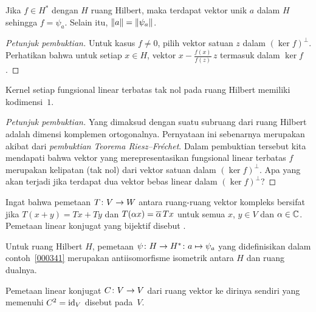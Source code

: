 \begin{thm}\label{000342} Jika $f \in H^*$ dengan $H$ ruang Hilbert,
maka terdapat vektor unik $a$ dalam $H$ sehingga $f = \psi_a$. Selain itu,
$\lVert a\rVert = \lVert\psi_a\rVert$.
\end{thm}

\begin{proof}[\emph{Petunjuk pembuktian}] Untuk kasus $f \ne 0$, pilih vektor satuan $z$ dalam $(\ker f)^\perp$.
Perhatikan bahwa untuk setiap $x \in H$, vektor $x - \frac{f(x)}{f(z)}\,z$ termasuk dalam $\ker f$. \ns
\end{proof}

\begin{cor} Kernel setiap fungsional linear terbatas tak nol pada ruang Hilbert memiliki kodimensi~$1$.
\end{cor}

\begin{proof}[\emph{Petunjuk pembuktian}]
Yang dimaksud dengan  suatu subruang dari ruang Hilbert adalah dimensi komplemen ortogonalnya. Pernyataan ini sebenarnya
merupakan akibat dari \emph{pembuktian} \emph{Teorema Riesz--Fr\'echet}. Dalam pembuktian tersebut kita mendapati bahwa vektor
yang merepresentasikan fungsional linear terbatas $f$ merupakan kelipatan (tak nol) dari vektor satuan dalam $(\ker f)^\perp$.
Apa yang akan terjadi jika terdapat dua vektor bebas linear dalam $(\ker f)^\perp$? \ns
\end{proof}

\begin{defn} Ingat bahwa pemetaan $T\colon V \rightarrow W$ antara ruang-ruang vektor kompleks bersifat
 jika $T(x + y) = Tx + Ty$ dan $T(\alpha x) = \overline{\alpha}\,Tx$ untuk semua
$x$, $y \in V$ dan $\alpha \in \mathbb{C}$. Pemetaan linear konjugat yang bijektif disebut
.
\end{defn}

\begin{exam}\label{0022057} Untuk ruang Hilbert $H$, pemetaan
$\psi\colon H \rightarrow H^*\colon a \mapsto \psi_a$ yang didefinisikan dalam contoh~\ref{000341} merupakan
antiisomorfisme isometrik antara $H$ dan ruang dualnya.
\end{exam}

\begin{defn} Pemetaan linear konjugat $C\colon V \rightarrow V$ dari ruang vektor ke dirinya sendiri
yang memenuhi $C^2 = \operatorname{id}_{V}$ disebut
 pada~$V$.
\end{defn}

